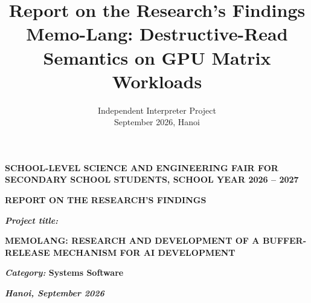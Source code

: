 \documentclass[a4paper]{article}
\begin{document}
	
	\title{Report on the Research's Findings \\
		{\large Memo-Lang: Destructive-Read Semantics on GPU Matrix Workloads}}
	
	\author{
		Independent Interpreter Project\\
		September 2026, Hanoi}
	
	\thispagestyle{plain}
	\begin{center}
		\bfseries
		SCHOOL-LEVEL SCIENCE AND ENGINEERING FAIR FOR SECONDARY SCHOOL STUDENTS, SCHOOL YEAR 2026 -- 2027
	\end{center}
	
	\vspace{5cm}
	
	\begin{center}
		\bfseries
		REPORT ON THE RESEARCH'S FINDINGS
	\end{center}
	
	\vspace{3cm}
	
	\begin{center}
		{\Large\bfseries\itshape Project title:}\\[10pt]
		{\Large\bfseries
		\MakeUppercase{MemoLang: Research and Development of a Buffer-Release Mechanism for AI Development}\par}
	\end{center}
	
	\vspace{3cm}
	
	\noindent\textbf{\textit{Category:} Systems Software}
	
	\vspace{6pt}
	
	\vfill
	
	\begin{center}
		\textbf{\textit{Hanoi, September 2026}}
	\end{center}
	
	\newpage
	
	\tableofcontents
	
	\listoffigures
	\listoftables
	
\end{document}
